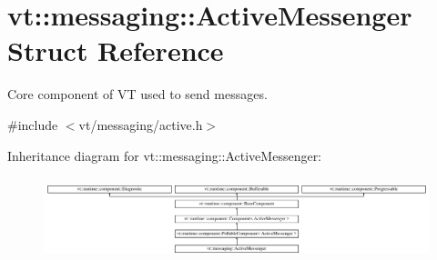 \hypertarget{structvt_1_1messaging_1_1_active_messenger}{}\section{vt\+:\+:messaging\+:\+:Active\+Messenger Struct Reference}
\label{structvt_1_1messaging_1_1_active_messenger}


Core component of VT used to send messages.  




{\ttfamily \#include $<$vt/messaging/active.\+h$>$}

Inheritance diagram for vt\+:\+:messaging\+:\+:Active\+Messenger\+:\begin{figure}[H]
\begin{center}
\leavevmode
\includegraphics[height=2.449694cm]{structvt_1_1messaging_1_1_active_messenger}
\end{center}
\end{figure}
